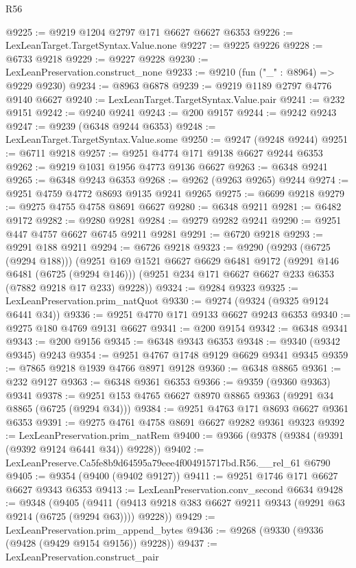 \begin{lexlean}{R56}
\begin{coremodule}
@9225 := @9219 @1204 @2797 @171 @6627 @6627 @6353
@9226 := LexLeanTarget.TargetSyntax.Value.none
@9227 := @9225 @9226
@9228 := @6733 @9218
@9229 := @9227 @9228
@9230 := LexLeanPreservation.construct_none
@9233 := @9210 (fun ("_" : @8964) => @9229 @9230)
@9234 := @8963 @6878
@9239 := @9219 @1189 @2797 @4776 @9140 @6627
@9240 := LexLeanTarget.TargetSyntax.Value.pair
@9241 := @232 @9151
@9242 := @9240 @9241
@9243 := @200 @9157
@9244 := @9242 @9243
@9247 := @9239 (@6348 @9244 @6353)
@9248 := LexLeanTarget.TargetSyntax.Value.some
@9250 := @9247 (@9248 @9244)
@9251 := @6711 @9218
@9257 := @9251 @4774 @171 @9138 @6627 @9244 @6353
@9262 := @9219 @1031 @1956 @4773 @9136 @6627
@9263 := @6348 @9241
@9265 := @6348 @9243 @6353
@9268 := @9262 (@9263 @9265) @9244
@9274 := @9251 @4759 @4772 @8693 @9135 @9241 @9265
@9275 := @6699 @9218
@9279 := @9275 @4755 @4758 @8691 @6627
@9280 := @6348 @9211
@9281 := @6482 @9172
@9282 := @9280 @9281
@9284 := @9279 @9282 @9241
@9290 := @9251 @447 @4757 @6627 @6745 @9211 @9281
@9291 := @6720 @9218
@9293 := @9291 @188 @9211
@9294 := @6726 @9218
@9323 := @9290
    (@9293 (@6725 (@9294 @188)))
    (@9251
      @169
      @1521
      @6627
      @6629
      @6481
      @9172
      (@9291 @146 @6481 (@6725 (@9294 @146)))
      (@9251 @234 @171 @6627 @6627 @233 @6353 (@7882 @9218 @17 @233) @9228))
@9324 := @9284 @9323
@9325 := LexLeanPreservation.prim_natQuot
@9330 := @9274 (@9324 (@9325 @9124 @6441 @34))
@9336 := @9251 @4770 @171 @9133 @6627 @9243 @6353
@9340 := @9275 @180 @4769 @9131 @6627
@9341 := @200 @9154
@9342 := @6348 @9341
@9343 := @200 @9156
@9345 := @6348 @9343 @6353
@9348 := @9340 (@9342 @9345) @9243
@9354 := @9251 @4767 @1748 @9129 @6629 @9341 @9345
@9359 := @7865 @9218 @1939 @4766 @8971 @9128
@9360 := @6348 @8865
@9361 := @232 @9127
@9363 := @6348 @9361 @6353
@9366 := @9359 (@9360 @9363) @9341
@9378 := @9251 @153 @4765 @6627 @8970 @8865 @9363 (@9291 @34 @8865 (@6725 (@9294 @34)))
@9384 := @9251 @4763 @171 @8693 @6627 @9361 @6353
@9391 := @9275 @4761 @4758 @8691 @6627 @9282 @9361 @9323
@9392 := LexLeanPreservation.prim_natRem
@9400 := @9366 (@9378 (@9384 (@9391 (@9392 @9124 @6441 @34)) @9228))
@9402 := LexLeanPreserve.Ca5fe8b9d64595a79eee4f004915717bd.R56.__rel_61 @6790
@9405 := @9354 (@9400 (@9402 @9127))
@9411 := @9251 @1746 @171 @6627 @6627 @9343 @6353
@9413 := LexLeanPreservation.conv_second @6634
@9428 := @9348
    (@9405 (@9411 (@9413 @9218 @383 @6627 @9211 @9343 (@9291 @63 @9214 (@6725 (@9294 @63)))) @9228))
@9429 := LexLeanPreservation.prim_append_bytes
@9436 := @9268 (@9330 (@9336 (@9428 (@9429 @9154 @9156)) @9228))
@9437 := LexLeanPreservation.construct_pair

\end{coremodule}
\end{lexlean}
